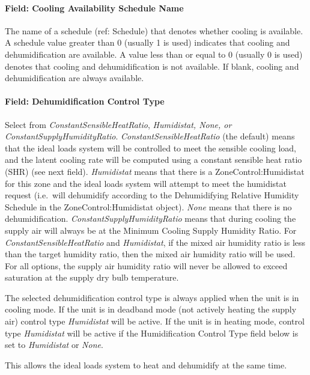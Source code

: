 \paragraph{Field: Cooling Availability Schedule Name}\label{field-cooling-availability-schedule-name-000}

The name of a schedule (ref: Schedule) that denotes whether cooling is available. A schedule value greater than 0 (usually 1 is used) indicates that cooling and dehumidification are available. A value less than or equal to 0 (usually 0 is used) denotes that cooling and dehumidification is not available. If blank, cooling and dehumidification are always available.

\paragraph{Field: Dehumidification Control Type}\label{field-dehumidification-control-type-000}

Select from \emph{ConstantSensibleHeatRatio}, \emph{Humidistat, None, or ConstantSupplyHumidityRatio}. \emph{ConstantSensibleHeatRatio} (the default) means that the ideal loads system will be controlled to meet the sensible cooling load, and the latent cooling rate will be computed using a constant sensible heat ratio (SHR) (see next field). \emph{Humidistat} means that there is a ZoneControl:Humidistat for this zone and the ideal loads system will attempt to meet the humidistat request (i.e.~will dehumidify according to the Dehumidifying Relative Humidity Schedule in the ZoneControl:Humidistat object). \emph{None} means that there is no dehumidification. \emph{ConstantSupplyHumidityRatio} means that during cooling the supply air will always be at the Minimum Cooling Supply Humidity Ratio. For \emph{ConstantSensibleHeatRatio} and \emph{Humidistat}, if the mixed air humidity ratio is less than the target humidity ratio, then the mixed air humidity ratio will be used. For all options, the supply air humidity ratio will never be allowed to exceed saturation at the supply dry bulb temperature.

The selected dehumidification control type is always applied when the unit is in cooling mode. If the unit is in deadband mode (not actively heating the supply air) control type \emph{Humidistat} will be active. If the unit is in heating mode, control type \emph{Humidistat} will be active if the Humidification Control Type field below is set to \emph{Humidistat} or \emph{None}.

This allows the ideal loads system to heat and dehumidify at the same time.


